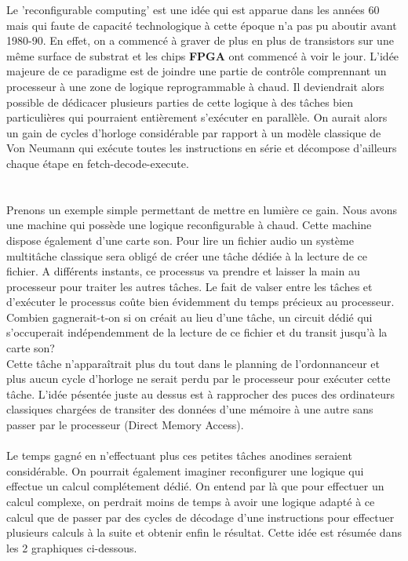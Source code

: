 \vspace{15px}
Le 'reconfigurable computing' est une idée qui est apparue dans les années 60 mais qui faute de capacité technologique à cette époque n'a pas pu aboutir avant 1980-90. En effet, on a commencé à graver de plus en plus de transistors sur une même surface de substrat et les chips {\bf FPGA} ont commencé à voir le jour.
L'idée majeure de ce paradigme est de joindre une partie de contrôle comprennant un processeur à une zone de logique reprogrammable à chaud. Il deviendrait alors possible de dédicacer plusieurs parties de cette logique à des tâches bien particulières qui pourraient entièrement s’exécuter en parallèle. On aurait alors un gain de cycles d'horloge considérable par rapport à un modèle classique de Von Neumann qui exécute toutes les instructions en série et décompose d'ailleurs chaque étape en fetch-decode-execute.\\
\\
\\
Prenons un exemple simple permettant de mettre en lumière ce gain. Nous avons une machine qui possède une logique reconfigurable à chaud. Cette machine dispose également d'une carte son. Pour lire un fichier audio un système multitâche classique sera obligé de créer une tâche dédiée à la lecture de ce fichier. A différents instants, ce processus va prendre et laisser la main au processeur pour traiter les autres tâches. Le fait de valser entre les tâches et d'exécuter le processus coûte bien évidemment du temps précieux au processeur. Combien gagnerait-t-on si on créait au lieu d'une tâche, un circuit dédié qui s'occuperait indépendemment de la lecture de ce fichier et du transit jusqu'à la carte son?\\
Cette tâche n'apparaîtrait plus du tout dans le planning de l'ordonnanceur et plus aucun cycle d'horloge ne serait perdu par le processeur pour exécuter cette tâche. L'idée pésentée juste au dessus est à rapprocher des puces des ordinateurs classiques chargées de transiter des données d'une mémoire à une autre sans passer par le processeur (Direct Memory Access).\\
\\
Le temps gagné en n'effectuant plus ces petites tâches anodines seraient considérable. On pourrait également imaginer reconfigurer une logique qui effectue un calcul complétement dédié. On entend par là que pour effectuer un calcul complexe, on perdrait moins de temps à avoir une logique adapté à ce calcul que de passer par des cycles de décodage d'une instructions pour effectuer plusieurs calculs à la suite et obtenir enfin le résultat. Cette idée est résumée dans les 2 graphiques ci-dessous.\\
